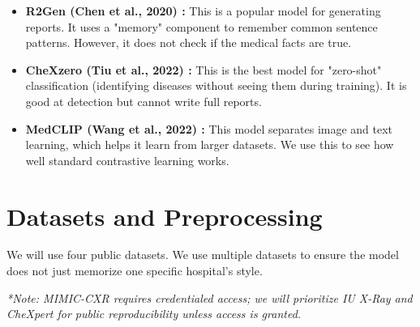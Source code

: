 \documentclass[11pt,a4paper]{article}
\begin{document}
\begin{itemize}
    \item \textbf{R2Gen (Chen et al., 2020) \cite{chen2020r2gen}:} This is a popular model for generating reports. It uses a "memory" component to remember common sentence patterns. However, it does not check if the medical facts are true.
    \item \textbf{CheXzero (Tiu et al., 2022) \cite{tiu2022chexzero}:} This is the best model for "zero-shot" classification (identifying diseases without seeing them during training). It is good at detection but cannot write full reports.
    \item \textbf{MedCLIP (Wang et al., 2022) \cite{wang2022medclip}:} This model separates image and text learning, which helps it learn from larger datasets. We use this to see how well standard contrastive learning works.
\end{itemize}

\section{Datasets and Preprocessing}
We will use four public datasets. We use multiple datasets to ensure the model does not just memorize one specific hospital's style.

\begin{table}[H]
\centering
\caption{Summary of Selected Public Chest X-Ray Datasets}
\label{tab:datasets}
\vspace{0.2cm}
\footnotesize{\textit{*Note: MIMIC-CXR requires credentialed access; we will prioritize IU X-Ray and CheXpert for public reproducibility unless access is granted.}}
\end{table}
\end{document}
